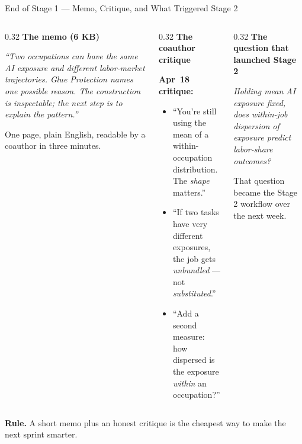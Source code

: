 \documentclass[10pt,english,aspectratio=169]{beamer}
\begin{document}
\begin{frame}{End of Stage 1 --- Memo, Critique, and What Triggered Stage 2}
\begin{columns}[T]
\begin{column}{0.32\textwidth}
\textbf{The memo (6 KB)}
\begin{tcolorbox}[colback=gray!5,colframe=gray!40]\scriptsize
\emph{``Two occupations can have the same AI exposure and different labor-market trajectories. Glue Protection names one possible reason. The construction is inspectable; the next step is to explain the pattern.''}
\end{tcolorbox}
\scriptsize One page, plain English, readable by a coauthor in three minutes.
\end{column}
\begin{column}{0.32\textwidth}
\textbf{The coauthor critique}
\begin{tcolorbox}[colback=gray!5,colframe=RedTitle!60]\scriptsize
\textbf{Apr~18 critique:}
\begin{itemize}\scriptsize
  \item ``You're still using the mean of a within-occupation distribution. The \emph{shape} matters.''
  \item ``If two tasks have very different exposures, the job gets \emph{unbundled} --- not \emph{substituted}.''
  \item ``Add a second measure: how dispersed is the exposure \emph{within} an occupation?''
\end{itemize}
\end{tcolorbox}
\end{column}
\begin{column}{0.32\textwidth}
\textbf{The question that launched Stage 2}
\begin{tcolorbox}[colback=blue!3,colframe=RedTitle!60]\small
\emph{Holding mean AI exposure fixed, does within-job dispersion of exposure predict labor-share outcomes?}
\end{tcolorbox}

\vspace{0.12cm}\scriptsize
That question became the Stage 2 workflow over the next week.
\end{column}
\end{columns}

\vspace{0.12cm}
\begin{tcolorbox}[colback=blue!3,colframe=RedTitle!60]\scriptsize
\textbf{Rule.} A short memo plus an honest critique is the cheapest way to make the next sprint smarter.
\end{tcolorbox}
\end{frame}
\end{document}
